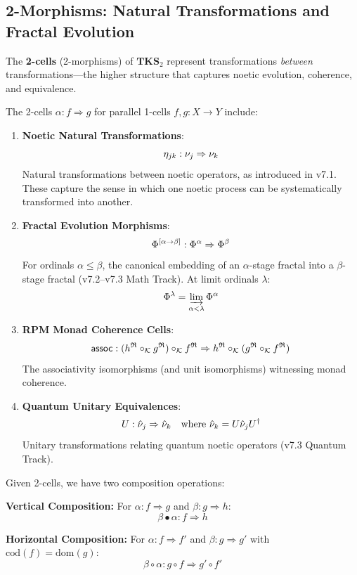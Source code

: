 \subsection{2-Morphisms: Natural Transformations and Fractal Evolution}

The \textbf{2-cells} (2-morphisms) of $\mathbf{TKS}_2$ represent transformations
\emph{between} transformations---the higher structure that captures noetic evolution,
coherence, and equivalence.

\begin{definition}
\label{def:2-cells-tks2}
The 2-cells $\alpha : f \Rightarrow g$ for parallel 1-cells $f, g : X \to Y$ include:

\begin{enumerate}[label=(\alph*)]
  \item \textbf{Noetic Natural Transformations}:
  \[
    \eta_{jk} : \nu_{j} \Rightarrow \nu_{k}
  \]
  Natural transformations between noetic operators, as introduced in v7.1. These capture
  the sense in which one noetic process can be systematically transformed into another.

  \item \textbf{Fractal Evolution Morphisms}:
  \[
    \Phi^{[\alpha \to \beta]} : \Phi^{\alpha} \Rightarrow \Phi^{\beta}
  \]
  For ordinals $\alpha \leq \beta$, the canonical embedding of an $\alpha$-stage fractal
  into a $\beta$-stage fractal (v7.2--v7.3 Math Track). At limit ordinals $\lambda$:
  \[
    \Phi^{\lambda} = \varinjlim_{\alpha < \lambda} \Phi^{\alpha}
  \]

  \item \textbf{RPM Monad Coherence Cells}:
  \[
    \mathsf{assoc} : (h^{\mathfrak{R}} \circ_{\mathcal{K}} g^{\mathfrak{R}}) \circ_{\mathcal{K}} f^{\mathfrak{R}}
                     \Rightarrow h^{\mathfrak{R}} \circ_{\mathcal{K}} (g^{\mathfrak{R}} \circ_{\mathcal{K}} f^{\mathfrak{R}})
  \]
  The associativity isomorphisms (and unit isomorphisms) witnessing monad coherence.

  \item \textbf{Quantum Unitary Equivalences}:
  \[
    U : \hat{\nu}_{j} \Rightarrow \hat{\nu}_{k} \quad \text{where }
        \hat{\nu}_{k} = U \hat{\nu}_{j} U^\dagger
  \]
  Unitary transformations relating quantum noetic operators (v7.3 Quantum Track).
\end{enumerate}
\end{definition}

\begin{definition}
\label{def:2-cell-composition}
Given 2-cells, we have two composition operations:

\textbf{Vertical Composition:} For $\alpha : f \Rightarrow g$ and $\beta : g \Rightarrow h$:
\[
\beta \bullet \alpha : f \Rightarrow h
\]

\textbf{Horizontal Composition:} For $\alpha : f \Rightarrow f'$ and $\beta : g \Rightarrow g'$
with $\mathrm{cod}(f) = \mathrm{dom}(g)$:
\[
\beta \circ \alpha : g \circ f \Rightarrow g' \circ f'
\]
\end{definition}


